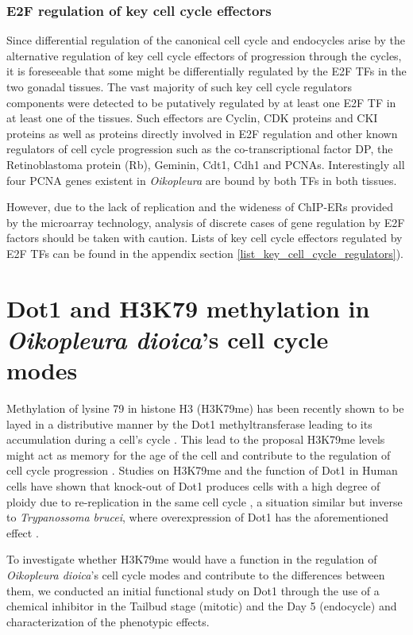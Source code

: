 \documentclass[11pt,twoside,a4paper]{report}
\begin{document}
		\subsubsection{E2F regulation of key cell cycle effectors}
		Since differential regulation of the canonical cell cycle and endocycles arise by the alternative regulation of key cell cycle effectors of progression through the cycles, it is foreseeable that some might be differentially regulated by the E2F TFs in the two gonadal tissues. The vast majority of such key cell cycle regulators components were detected to be putatively regulated by at least one E2F TF in at least one of the tissues. Such effectors are Cyclin, CDK proteins and CKI proteins as well as proteins directly involved in E2F regulation and other known regulators of cell cycle progression such as the co-transcriptional factor DP, the Retinoblastoma protein (Rb), Geminin, Cdt1, Cdh1 and PCNAs. Interestingly all four PCNA genes existent in \textit{Oikopleura} are bound by both TFs in both tissues.
		
		However, due to the lack of replication and the wideness of ChIP-ERs provided by the microarray technology, analysis of discrete cases of gene regulation by E2F factors should be taken with caution. Lists of key cell cycle effectors regulated by E2F TFs can be found in the appendix section \ref{list_key_cell_cycle_regulators}).


\clearpage
\section{Dot1 and H3K79 methylation in \textit{Oikopleura dioica}'s cell cycle modes}
	Methylation of lysine 79 in histone H3 (H3K79me) has been recently shown to be layed in a distributive manner by the Dot1 methyltransferase leading to its accumulation during a cell's cycle \cite{Frederiks2008}. This lead to the proposal H3K79me levels might act as memory for the age of the cell and contribute to the regulation of cell cycle progression \cite{DeVos2011}. Studies on H3K79me and the function of Dot1 in Human cells have shown that knock-out of Dot1 produces cells with a high degree of ploidy due to re-replication in the same cell cycle \cite{Fu2013a}, a situation similar but inverse to \textit{Trypanossoma brucei}, where overexpression of Dot1 has the aforementioned effect \cite{Gassen2012}.
	
	To investigate whether H3K79me would have a function in the regulation of \textit{Oikopleura dioica}'s cell cycle modes and contribute to the differences between them, we conducted an initial functional study on Dot1 through the use of a chemical inhibitor in the Tailbud stage (mitotic) and the Day 5 (endocycle) and characterization of the phenotypic effects.
	
\end{document}
